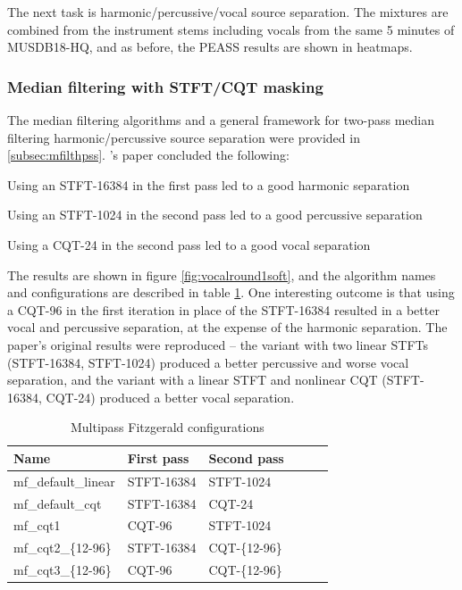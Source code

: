 \documentclass[letter,12pt]{article}
\newenvironment{tight_enumerate}{
\begin{enumerate}
  \setlength{\itemsep}{0pt}
  \setlength{\parskip}{0pt}
}{\end{enumerate}}
\begin{document}
The next task is harmonic/percussive/vocal source separation. The mixtures are combined from the instrument stems including vocals from the same 5 minutes of MUSDB18-HQ, and as before, the PEASS results are shown in heatmaps.

\subsubsection{Median filtering with STFT/CQT masking}
\label{subsec:mfvocalsep}

The median filtering algorithms and a general framework for two-pass median filtering harmonic/percussive source separation were provided in \ref{subsec:mfilthpss}. \citet{fitzgerald2}'s paper concluded the following:
\begin{tight_enumerate}
	\item
		Using an STFT-16384 in the first pass led to a good harmonic separation
	\item
		Using an STFT-1024 in the second pass led to a good percussive separation
	\item
		Using a CQT-24 in the second pass led to a good vocal separation
\end{tight_enumerate}

The results are shown in figure \ref{fig:vocalround1soft}, and the algorithm names and configurations are described in table \ref{table:round3softvocal}. One interesting outcome is that using a CQT-96 in the first iteration in place of the STFT-16384 resulted in a better vocal and percussive separation, at the expense of the harmonic separation. The paper's original results were reproduced -- the variant with two linear STFTs (STFT-16384, STFT-1024) produced a better percussive and worse vocal separation, and the variant with a linear STFT and nonlinear CQT (STFT-16384, CQT-24) produced a better vocal separation.

\begin{table}[ht]
	\centering
\begin{tabular}{ |l|l|l|c|c|c| }
	 \hline
	  Name & First pass & Second pass  \\
	 \hline
	 \hline
	 mf\_default\_linear & STFT-16384 & STFT-1024 \\
	 \hline
	 mf\_default\_cqt & STFT-16384 & CQT-24 \\
	 \hline
	 mf\_cqt1 & CQT-96 & STFT-1024 \\
	 \hline
	 mf\_cqt2\_\{12-96\} & STFT-16384 & CQT-\{12-96\} \\
	 \hline
	 mf\_cqt3\_\{12-96\} & CQT-96 & CQT-\{12-96\} \\
	 \hline
\end{tabular}
	\caption{Multipass Fitzgerald configurations}
	\label{table:round3softvocal}
\end{table}
\end{document}
